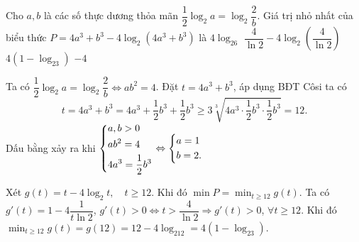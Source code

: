 \begin{ex}%
Cho $a,b$ là các số thực dương thỏa mãn $\dfrac{1}{2}\log_2a=\log_2\dfrac{2}{b}$. Giá trị nhỏ nhất của biểu thức $P=4a^3+b^3-4\log_2(4a^3+b^3)$ là
\choice
{$4\log_26$}
{$\dfrac{4}{\ln 2}-4\log_2\left(\dfrac{4}{\ln 2}\right)$}
{\True $4(1-\log_23)$}
{$-4$}
\loigiai
{
Ta có $\dfrac{1}{2}\log_2a=\log_2\dfrac{2}{b}\Leftrightarrow ab^2=4$. Đặt $t=4a^3+b^3$, áp dụng BĐT Côsi ta có
$$t=4a^3+b^3=4a^3+\dfrac{1}{2}b^3+\dfrac{1}{2}b^3\geq 3\sqrt[3]{4a^3\cdot\dfrac{1}{2}b^3\cdot\dfrac{1}{2}b^3}=12.$$
Dấu bằng xảy ra khi $\left\{\begin{aligned}&a, b>0\\&ab^2=4\\&4a^3=\dfrac{1}{2}b^3\end{aligned}\right.\Leftrightarrow\left\{\begin{aligned}&a=1\\&b=2.\end{aligned}\right.$

Xét $g(t)=t-4\log_2 t,\quad t\geq 12$. Khi đó $\min P=\displaystyle\min_{t\geq 12}g(t)$.
Ta có $g'(t)=1-4\dfrac{1}{t\ln 2}$, $g'(t)>0\Leftrightarrow  t>\dfrac{4}{\ln 2}\Rightarrow g'(t)>0$, $\forall t\geq 12$.
Khi đó $\displaystyle\min_{t\geq 12}g(t)=g(12)=12-4\log_212=4(1-\log_23)$.
}
\end{ex}
